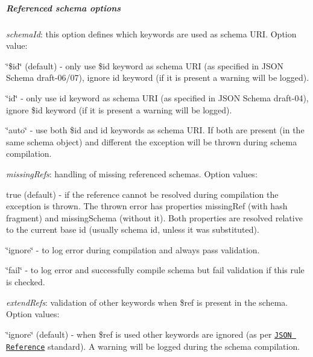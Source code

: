 \subparagraph*{Referenced schema options}


\begin{DoxyItemize}
\item {\itshape schema\+Id}\+: this option defines which keywords are used as schema U\+RI. Option value\+:
\begin{DoxyItemize}
\item {\ttfamily \char`\"{}\$id\char`\"{}} (default) -\/ only use {\ttfamily \$id} keyword as schema U\+RI (as specified in J\+S\+ON Schema draft-\/06/07), ignore {\ttfamily id} keyword (if it is present a warning will be logged).
\item {\ttfamily \char`\"{}id\char`\"{}} -\/ only use {\ttfamily id} keyword as schema U\+RI (as specified in J\+S\+ON Schema draft-\/04), ignore {\ttfamily \$id} keyword (if it is present a warning will be logged).
\item {\ttfamily \char`\"{}auto\char`\"{}} -\/ use both {\ttfamily \$id} and {\ttfamily id} keywords as schema U\+RI. If both are present (in the same schema object) and different the exception will be thrown during schema compilation.
\end{DoxyItemize}
\item {\itshape missing\+Refs}\+: handling of missing referenced schemas. Option values\+:
\begin{DoxyItemize}
\item {\ttfamily true} (default) -\/ if the reference cannot be resolved during compilation the exception is thrown. The thrown error has properties {\ttfamily missing\+Ref} (with hash fragment) and {\ttfamily missing\+Schema} (without it). Both properties are resolved relative to the current base id (usually schema id, unless it was substituted).
\item {\ttfamily \char`\"{}ignore\char`\"{}} -\/ to log error during compilation and always pass validation.
\item {\ttfamily \char`\"{}fail\char`\"{}} -\/ to log error and successfully compile schema but fail validation if this rule is checked.
\end{DoxyItemize}
\item {\itshape extend\+Refs}\+: validation of other keywords when {\ttfamily \$ref} is present in the schema. Option values\+:
\begin{DoxyItemize}
\item {\ttfamily \char`\"{}ignore\char`\"{}} (default) -\/ when {\ttfamily \$ref} is used other keywords are ignored (as per \href{https://tools.ietf.org/html/draft-pbryan-zyp-json-ref-03#section-3}{\tt J\+S\+ON Reference} standard). A warning will be logged during the schema compilation.

\end{DoxyItemize}
\end{DoxyItemize}
